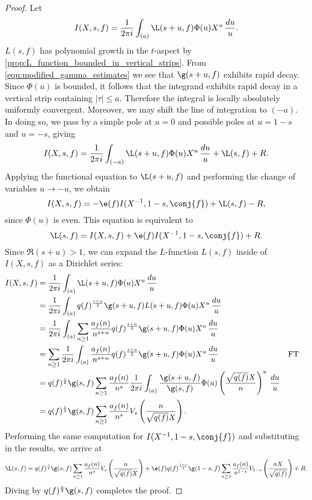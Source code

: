     \begin{proof}
      Let
      \[
        I(X,s,f) = \frac{1}{2\pi i}\int_{(a)}\L(s+u,f)\Phi(u)X^{u}\,\frac{du}{u}.
      \]
      $L(s,f)$ has polynomial growth in the $t$-aspect by \cref{prop:L_function_bounded_in_vertical_strips}. From \cref{equ:modified_gamma_estimates} we see that $\g(s+u,f)$ exhibits rapid decay. Since $\Phi(u)$ is bounded, it follows that the integrand exhibits rapid decay in a vertical strip containing $|\tau| \le a$. Therefore the integral is locally absolutely uniformly convergent. Moreover, we may shift the line of integration to $(-a)$. In doing so, we pass by a simple pole at $u = 0$ and possible poles at $u = 1-s$ and $u = -s$, giving
      \[
        I(X,s,f) = \frac{1}{2\pi i}\int_{(-a)}\L(s+u,f)\Phi(u)X^{u}\,\frac{du}{u}+\L(s,f)+R.
      \]
      Applying the functional equation to $\L(s+u,f)$ and performing the change of variables $u \to -u$, we obtain
      \[
        I(X,s,f) = -\e(f)I(X^{-1},1-s,\conj{f})+\L(s,f)-R,
      \]
      since $\Phi(u)$ is even. This equation is equivalent to
      \[
        \L(s,f) = I(X,s,f)+\e(f)I(X^{-1},1-s,\conj{f})+R.
      \]
      Since $\Re(s+u) > 1$, we can expand the $L$-function $L(s,f)$ inside of $I(X,s,f)$ as a Dirichlet series:
      \begin{align*}
        I(X,s,f) &= \frac{1}{2\pi i}\int_{(a)}\L(s+u,f)\Phi(u)X^{u}\,\frac{du}{u} \\
        &= \frac{1}{2\pi i}\int_{(a)}q(f)^{\frac{s+u}{2}}\g(s+u,f)L(s+u,f)\Phi(u)X^{u}\,\frac{du}{u} \\
        &= \frac{1}{2\pi i}\int_{(a)}\sum_{n \ge 1}\frac{a_{f}(n)}{n^{s+u}}q(f)^{\frac{s+u}{2}}\g(s+u,f)\Phi(u)X^{u}\,\frac{du}{u} \\
        &= \sum_{n \ge 1}\frac{1}{2\pi i}\int_{(a)}\frac{a_{f}(n)}{n^{s+u}}q(f)^{\frac{s+u}{2}}\g(s+u,f)\Phi(u)X^{u}\,\frac{du}{u} && \text{FT} \\
        &= q(f)^{\frac{s}{2}}\g(s,f)\sum_{n \ge 1}\frac{a_{f}(n)}{n^{s}}\frac{1}{2\pi i}\int_{(a)}\frac{\g(s+u,f)}{\g(s,f)}\Phi(u)\left(\frac{\sqrt{q(f)}X}{n}\right)^{u}\,\frac{du}{u} \\
        &= q(f)^{\frac{s}{2}}\g(s,f)\sum_{n \ge 1}\frac{a_{f}(n)}{n^{s}}V_{s}\left(\frac{n}{\sqrt{q(f)}X}\right).
      \end{align*}
      Performing the same computation for $I(X^{-1},1-s,\conj{f})$ and substituting in the results, we arrive at
      \[
        \L(s,f) = q(f)^{\frac{s}{2}}\g(s,f)\sum_{n \ge 1}\frac{a_{f}(n)}{n^{s}}V_{s}\left(\frac{n}{\sqrt{q(f)}X}\right)+\e(f)q(f)^{\frac{1-s}{2}}\g(1-s,f)\sum_{n \ge 1}\frac{a_{f}(n)}{n^{1-s}}V_{1-s}\left(\frac{nX}{\sqrt{q(f)}}\right)+R.
      \]
      Diving by $q(f)^{\frac{s}{2}}\g(s,f)$ completes the proof.
    \end{proof}

